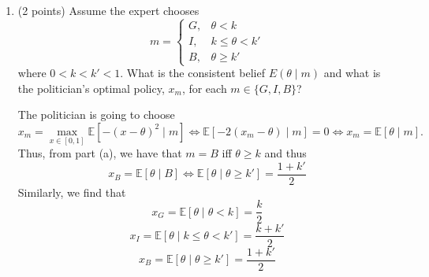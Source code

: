 \documentclass[11pt]{article}
\newcommand{\bbE}{\mathbb{E}}
\begin{document}
\begin{enumerate}
\begin{solution}
\begin{itemize}
                Similarly, 
                \[\theta \leq \frac{x_G + x_B}{2} - b\] Thus, the expert will choose $G$ iff 
                \begin{align}
                    \boxed{\theta \leq \min\{\frac{x_B + x_G}{2} - b, \frac{x_G +x_I}{2} - b\} = \max\{\frac{x_I + x_G}{2}- b,0\}=:k}
                \end{align}
                \item We use similar reasoning to figure out that the expert will choose $I$ iff
                \begin{align}
                    \boxed{k \leq \theta \leq k'}
                \end{align}
                
            \end{itemize}
        \end{solution}
        
        \item (2 points) Assume the expert chooses
        \[
        m = \begin{cases}
        G, & \theta < k \\
        I, & k \leq \theta < k' \\
        B, & \theta \geq k'
        \end{cases}
        \]
        where $0 < k < k' < 1$. What is the consistent belief $E(\theta \mid m)$ and what is the politician’s optimal policy, $x_m$, for each $m \in \{G, I, B\}$?
    \begin{solution}
        The politician is going to choose
        \[x_m = \max_{x\in [0,1]}\bbE[-(x - \theta)^2 \mid m] \iff \bbE[-2(x_m - \theta)\mid m] = 0 \iff x_m = \bbE[\theta \mid m].\]
        Thus, from part (a), we have that $m = B$ iff $\theta \geq k$ and thus 
        \[x_B = \bbE[\theta \mid B]\iff \bbE[\theta \mid \theta \geq k'] = \frac{1 + k'   }{2}\]
        Similarly, we find that
        \[x_G = \bbE[\theta \mid \theta < k] = \frac{k}{2}\]
        \[x_I = \bbE[\theta \mid k \leq \theta < k'] = \frac{k + k'}{2}\]
        \[x_B = \bbE[\theta \mid \theta \geq k'] = \frac{1 +  k'}{2}\]
    \end{solution}


\end{enumerate}
\end{document}
